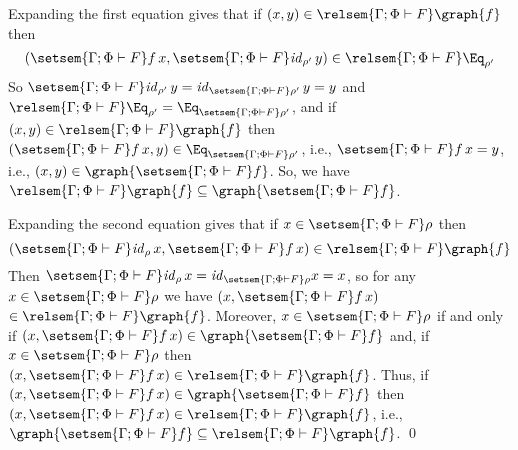 \documentclass{lmcs}
\theoremstyle{plain}\newtheorem{satz}[thm]{Satz}
\renewcommand{\id}{\mathit{id}}
\begin{document}
Expanding the first equation gives that if $(x,y) \in \relsem{\Gamma;
  \Phi \vdash F}\graph{f}$ then
\[(\setsem{\Gamma; \Phi \vdash F} f\,
x, \setsem{\Gamma; \Phi \vdash F}\id_{\rho'}\, y) \in \relsem{\Gamma;
  \Phi \vdash F}\Eq_{\rho'}\] So $\setsem{\Gamma; \Phi \vdash
  F}\id_{\rho'}\, y = \id_{\setsem{\Gamma; \Phi \vdash F}\rho'}\, y =
y$ and $\relsem{\Gamma; \Phi \vdash F}\Eq_{\rho'} =
\Eq_{\setsem{\Gamma; \Phi \vdash F}\rho'}$, and if $(x,y) \in
\relsem{\Gamma; \Phi \vdash F}\graph{f}$ then $(\setsem{\Gamma; \Phi
  \vdash F} f\, x, y) \in \Eq_{\setsem{\Gamma; \Phi \vdash F}\rho'}$,
i.e., $\setsem{\Gamma; \Phi \vdash F} f\, x = y$, i.e., $(x, y) \in
\graph{\setsem{\Gamma; \Phi \vdash F} f}$.  So, we have
$\relsem{\Gamma; \Phi \vdash F}\graph{f} \subseteq
\graph{\setsem{\Gamma; \Phi \vdash F}f}$.

Expanding the second equation gives that if $x \in \setsem{\Gamma;
  \Phi \vdash F}\rho$ then
\[(\setsem{\Gamma; \Phi \vdash F}\id_{\rho}\, x, \setsem{\Gamma;
  \Phi \vdash F} f\, x) \in \relsem{\Gamma; \Phi \vdash F}\graph{f}\]
Then $\setsem{\Gamma; \Phi \vdash F}\id_{\rho}\, x =
\id_{\setsem{\Gamma; \Phi \vdash F}\rho} x = x$, so for any $x \in
\setsem{\Gamma; \Phi \vdash F}\rho$ we have $(x, \setsem{\Gamma;
  \Phi \vdash F}f\, x)$ $\in \relsem{\Gamma; \Phi \vdash F}\graph{f}$.
Moreover, $x \in \setsem{\Gamma; \Phi \vdash F}\rho$ if and only if
$(x, \setsem{\Gamma; \Phi \vdash F} f\, x) \in \graph{\setsem{\Gamma;
    \Phi \vdash F}f}$ and, if $x \in \setsem{\Gamma; \Phi \vdash
  F}\rho$ then $(x, \setsem{\Gamma; \Phi \vdash F} f\, x) \in
\relsem{\Gamma; \Phi \vdash F} \graph{f}$. Thus, if $(x, \setsem{\Gamma;
  \Phi \vdash F} f\, x) \in \graph{\setsem{\Gamma; \Phi \vdash F}f}$
then $(x, \setsem{\Gamma; \Phi \vdash F} f\, x) \in \relsem{\Gamma;
  \Phi \vdash F} \graph{f}$, i.e., $\graph{\setsem{\Gamma; \Phi \vdash
    F}f} \subseteq \relsem{\Gamma; \Phi \vdash F} \graph{f}$.  \qed
\end{document}
